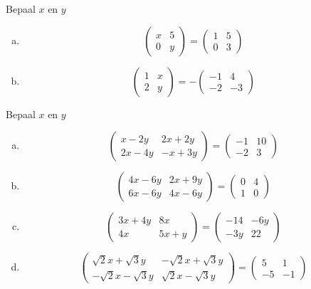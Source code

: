 \documentclass[12pt,twoside]{article}
\begin{document}
\begin{oefening}
Bepaal $x$ en $y$
\begin{enumerate}[(a)]
  \item
    $$\begin{pmatrix}
      x & 5\\
      0 & y
    \end{pmatrix}
    =
    \begin{pmatrix}
      1 & 5\\
      0 & 3
    \end{pmatrix}$$
  \item
    $$\begin{pmatrix}
      1 & x\\
      2 & y
    \end{pmatrix}
    =
    -\begin{pmatrix}
      -1 & 4\\
      -2 & -3
    \end{pmatrix}$$
\end{enumerate}
\end{oefening}

\begin{oefening}
Bepaal $x$ en $y$
\begin{enumerate}[(a)]
  \item
$$\begin{pmatrix}
  x-2y  & 2x+2y\\
  2x-4y & -x+3y
\end{pmatrix}
=
\begin{pmatrix}
  -1 & 10\\
  -2 & 3
\end{pmatrix}$$
  \item
$$\begin{pmatrix}
  4x-6y  & 2x+9y\\
  6x-6y & 4x-6y
\end{pmatrix}
=
\begin{pmatrix}
  0 & 4\\
  1 & 0
\end{pmatrix}$$
  \item
$$\begin{pmatrix}
  3x+4y  & 8x\\
  4x & 5x+y
\end{pmatrix}
=
\begin{pmatrix}
  -14 & -6y\\
  -3y & 22
\end{pmatrix}$$
  \item
$$\begin{pmatrix}
  \sqrt{2}x+\sqrt{3}y  & -\sqrt{2}x+\sqrt{3}y \\
  -\sqrt{2}x-\sqrt{3}y  & \sqrt{2}x-\sqrt{3}y 
\end{pmatrix}
=
\begin{pmatrix}
  5 & 1\\
  -5 & -1
\end{pmatrix}$$
\end{enumerate}
\end{oefening}
\end{document}
